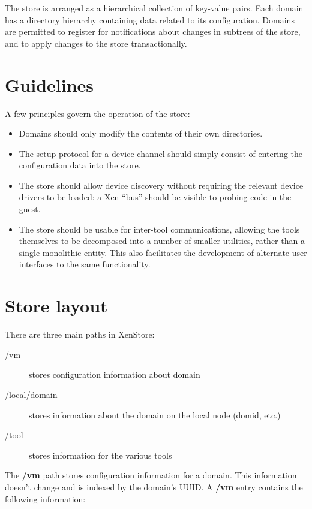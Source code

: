 \documentclass[11pt,twoside,final,openright,a4paper]{report}
\begin{document}
The store is arranged as a hierarchical collection of key-value pairs.
Each domain has a directory hierarchy containing data related to its
configuration.  Domains are permitted to register for notifications
about changes in subtrees of the store, and to apply changes to the
store transactionally.

\section{Guidelines}

A few principles govern the operation of the store:

\begin{itemize}
\item Domains should only modify the contents of their own
  directories.
\item The setup protocol for a device channel should simply consist of
  entering the configuration data into the store.
\item The store should allow device discovery without requiring the
  relevant device drivers to be loaded: a Xen ``bus'' should be
  visible to probing code in the guest.
\item The store should be usable for inter-tool communications,
  allowing the tools themselves to be decomposed into a number of
  smaller utilities, rather than a single monolithic entity.  This
  also facilitates the development of alternate user interfaces to the
  same functionality.
\end{itemize}

\section{Store layout}

There are three main paths in XenStore:

\begin{description}
\item[/vm] stores configuration information about domain
\item[/local/domain] stores information about the domain on the local node (domid, etc.)
\item[/tool] stores information for the various tools
\end{description}

The {\bf /vm} path stores configuration information for a domain.
This information doesn't change and is indexed by the domain's UUID.
A {\bf /vm} entry contains the following information:
\end{document}
